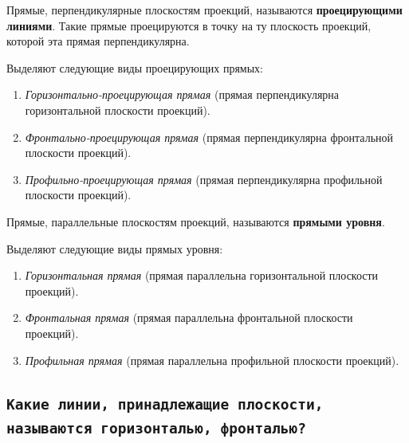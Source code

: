 Прямые, перпендикулярные плоскостям проекций, называются {\bf проецирующими
линиями}. Такие прямые проецируются в точку на ту плоскость проекций, которой эта
прямая перпендикулярна.

Выделяют следующие виды проецирующих прямых:
\begin{enumerate}
    \item \textit {Горизонтально-проецирующая прямая} (прямая перпендикулярна горизонтальной плоскости проекций).
    

    \item \textit{Фронтально-проецирующая прямая} (прямая перпендикулярна фронтальной плоскости проекций).


    \item \textit {Профильно-проецирующая прямая} (прямая перпендикулярна профильной плоскости проекций).


\end{enumerate}


Прямые, параллельные плоскостям проекций, называются {\bf прямыми
уровня}.

Выделяют следующие виды прямых уровня:
\begin{enumerate}
    \item \textit {Горизонтальная прямая} (прямая параллельна горизонтальной плоскости проекций).
    

    \item \textit {Фронтальная прямая} (прямая параллельна фронтальной плоскости проекций).


    \item \textit {Профильная прямая} (прямая параллельна профильной плоскости проекций).


\end{enumerate}


\newpage
\subsection{\texttt{Какие линии, принадлежащие плоскости, называются горизонталью, фронталью?}}

